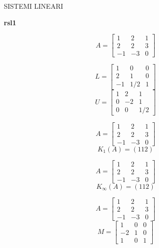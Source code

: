 \def\N{\hbox{I\kern-.2em\hbox{N}}}
\def\P{\hbox{I\kern-.2em\hbox{P}}}
\def\R{\hbox{\rm I\kern-.2em\hbox{\rm R}}}
\def\Z{\hbox{\rm Z\kern-4.0pt{\rm Z}}}


\large \centerline {\textsc{SISTEMI LINEARI}} \noindent
 {\bf rsl1}

\bigskip
$$A=\left[
\begin{array}{ccc}
1 & 2 & 1 \\
2 & 2 & 3\\
-1 & -3 & 0
\end{array}\right]
$$

\bigskip
$$ L=\left[
\begin{array}{ccc}
1 & 0 & 0 \\
2 & 1 & 0\\
-1 & 1/2 & 1
\end{array}
\right]$$
$$ U=\left[
\begin{array}{ccc}
 1& 2 & 1 \\
 0 & -2 & 1 \\
  0 &0 & 1/2
\end{array}
\right] $$


\bigskip
$$A=\left[
\begin{array}{ccc}
1 & 2 & 1 \\
2 & 2 & 3\\
-1 & -3 & 0
\end{array}\right]
$$
\bigskip
\begin{equation}\label{pp}
  K_1(A)= \left(112
  \right)
\end{equation}

\noindent {}


\bigskip
$$A=\left[
\begin{array}{ccc}
1 & 2 & 1 \\
2 & 2 & 3\\
-1 & -3 & 0
\end{array}\right]
$$
\bigskip
\begin{equation}\label{pp}
  K_\infty (A)= \left(
  112 \right)
\end{equation}




\bigskip
$$A=\left[
\begin{array}{ccc}
1 & 2 & 1 \\
2 & 2 & 3\\
-1 & -3 & 0
\end{array}\right]
$$
\bigskip
$$ M=\left[
\begin{array}{ccc}
  1 & 0 & 0 \\
 -2 & 1 & 0 \\
  1 & 0 & 1
\end{array}
\right]$$

